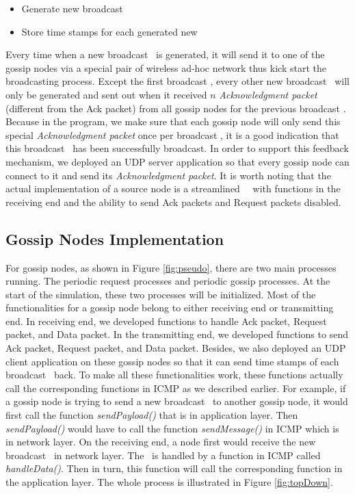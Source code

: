 \begin{itemize}
	\item Generate new broadcast \msgs
	\item Store time stamps for each generated new \msgs
\end{itemize}

Every time when a new broadcast \msg ~is generated, it will send it to one of the gossip nodes via a special pair of wireless ad-hoc network thus kick start the broadcasting process. Except the first broadcast \msg, every other new broadcast \msg ~will only be generated and sent out when it received $n$ \emph{Acknowledgment packet} (different from the Ack packet) from all gossip nodes for the previous broadcast \msg. Because in the program, we make sure that each gossip node will only send this special \emph{Acknowledgment packet }once per broadcast \msg, it is a good indication that this broadcast \msg ~has been successfully broadcast. In order to support this feedback mechanism, we deployed an UDP server application so that every gossip node can connect to it and send its \emph{Acknowledgment packet}. It is worth noting that the actual implementation of a source node is a streamlined \gn ~\im ~with functions in the receiving end and the ability to send Ack packets and Request packets disabled. 

\subsection{Gossip Nodes Implementation}
For gossip nodes, as shown in Figure \ref{fig:pseudo}, there are two main processes running. The periodic request processes and periodic gossip processes. At the start of the simulation, these two processes will be initialized. Most of the functionalities for a gossip node belong to either receiving end or transmitting end. In receiving end, we developed functions to handle Ack packet, Request packet, and Data packet. In the transmitting end, we developed functions to send Ack packet, Request packet, and Data packet. Besides, we also deployed an UDP client application on these gossip nodes so that it can send time stamps of each broadcast \msg ~back. To make all these functionalities work, these functions actually call the corresponding functions in ICMP as we described earlier. For example, if a gossip node is trying to send a new broadcast \msg ~to another gossip node, it would first call the function \emph{sendPayload()} that is in application layer. Then \emph{sendPayload()} would have to call the function \emph{sendMessage()} in ICMP which is in network layer. On the receiving end, a node first would receive the new broadcast \msg ~in network layer. The \msg ~is handled by a function in ICMP called \emph{handleData()}. Then in turn, this function will call the corresponding function in the application layer. The whole process is illustrated in Figure \ref{fig:topDown}.


